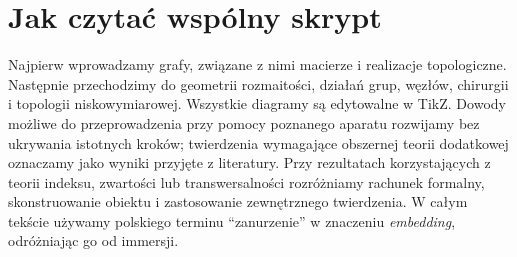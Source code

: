 \chapter*{Jak czytać wspólny skrypt}
Najpierw wprowadzamy grafy, związane z nimi macierze i realizacje topologiczne.
Następnie przechodzimy do geometrii rozmaitości, działań grup,
węzłów, chirurgii i topologii niskowymiarowej.
Wszystkie diagramy są edytowalne w TikZ. Dowody możliwe do przeprowadzenia
przy pomocy poznanego aparatu rozwijamy bez ukrywania istotnych kroków;
twierdzenia wymagające obszernej teorii dodatkowej oznaczamy jako
wyniki przyjęte z literatury. Przy rezultatach korzystających z teorii
indeksu, zwartości lub transwersalności rozróżniamy rachunek formalny,
skonstruowanie obiektu i zastosowanie zewnętrznego twierdzenia.
W całym tekście używamy polskiego terminu ``zanurzenie'' w znaczeniu
\emph{embedding}, odróżniając go od immersji.

